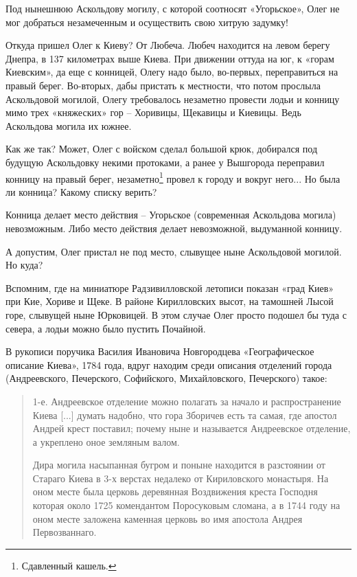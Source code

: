 
Под нынешнюю Аскольдову могилу, с которой соотносят «Угорьское», Олег не мог добраться незамеченным и осуществить свою хитрую задумку! %

Откуда пришел Олег к Киеву? От Любеча. Любеч находится на левом берегу Днепра, в 137 километрах выше Киева. При движении оттуда на юг, к «горам Киевским», да еще с конницей, Олегу надо было, во-первых, переправиться на правый берег. Во-вторых, дабы пристать к местности, что потом прослыла Аскольдовой могилой, Олегу требовалось незаметно провести лодьи и конницу мимо трех «княжеских» гор – Хоривицы, Щекавицы и Киевицы. Ведь Аскольдова могила их южнее.

Как же так? Может, Олег с войском сделал большой крюк, добирался под будущую Аскольдовку некими протоками, а ранее у Вышгорода переправил конницу на правый берег, незаметно\footnote{Сдавленный кашель.} провел к городу и вокруг него... Но была ли конница? Какому списку верить?

Конница делает место действия – Угорьское (современная Аскольдова могила) невозможным. Либо место действия делает невозможной, выдуманной конницу.

А допустим, Олег пристал не под место, слывущее ныне Аскольдовой могилой. Но куда?

Вспомним, где на миниатюре Радзивилловской летописи показан «град Киев» при Кие, Хориве и Щеке. В районе Кирилловских высот, на тамошней Лысой горе, слывущей ныне Юрковицей. В этом случае Олег просто подошел бы туда с севера, а лодьи можно было пустить Почайной.

В рукописи поручика Василия Ивановича Новгородцева «Географическое описание Киева», 1784 года\cite{sbornikmat}, вдруг находим среди описания отделений города (Андреевского, Печерского, Софийского, Михайловского, Печерского) такое:

\begin{quotation}
1-е. Андреевское отделение можно полагать за начало и распространение Киева [...] думать надобно, что гора Зборичев есть та самая, где апостол Андрей крест поставил; почему ныне и называется Андреевское отделение, а укреплено оное земляным валом.

Дира могила насыпанная бугром и поныне находится в разстоянии от Стараго Киева в 3-х верстах недалеко от Кириловского монастыря. На оном месте была церковь деревянная Воздвижения креста Господня которая около 1725 комендантом Поросуковым сломана, а в 1744 году на оном месте заложена  каменная церковь во имя апостола Андрея Первозваннаго.
\end{quotation}


